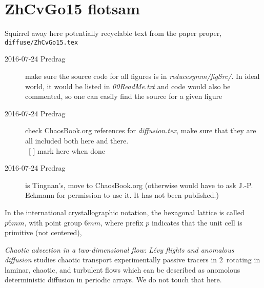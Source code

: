 
\section{ZhCvGo15 flotsam}
\label{s:flotsam}

Squirrel away here potentially recyclable text from the
paper proper, \texttt{diffuse/ZhCvGo15.tex}

\bigskip\bigskip
\begin{description}

\item[2016-07-24 Predrag]
    make sure the source code for all figures is in
    \emph{reducesymm/figSrc/}. In ideal world, it would be listed in
    \emph{00ReadMe.txt} and code would also be commented, so one can
    easily find the source for a given figure
\item[2016-07-24 Predrag]
    check ChaosBook.org references for \emph{diffusion.tex},
    make sure that they are all included both here and there.
    \\
    ~[ ] mark here when done

\item[2016-07-24 Predrag]
     is Tingnan's, move to ChaosBook.org
    (otherwise
	would have to ask J.-P. Eckmann for permission to use it. It has not been
	published.)


\end{description}
\bigskip\bigskip


%


In the international crystallographic notation, the hexagonal lattice is
called $p6mm$, with point group $6mm$, where prefix $p$ indicates that
the unit cell is primitive (not centered),


                                                            \toCB
{} {\em Chaotic advection in a two-dimensional
flow: L\'evy flights and anomalous diffusion} studies chaotic transport
experimentally passive tracers in $2$\dmn\ rotating in laminar, chaotic,
and turbulent flows which can be described as anomolous deterministic
diffusion in periodic arrays. We do not touch that here.


